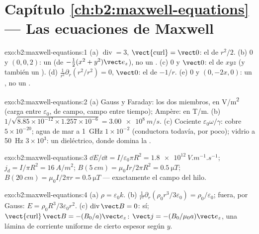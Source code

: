 \section*{Capítulo \ref{ch:b2:maxwell-equations} --- Las ecuaciones de Maxwell}

\begin{solution}{exo:b2:maxwell-equations:1}
(a) $\operatorname{div} = 3$, $\operatorname{\vect{curl}} = \vect 0$: el  de $r^2/2$.
(b) $0$ y $(0, 0, 2)$: un  (de $-\tfrac12(x^2 + y^2)\vect e_z$), no un
. (c) $0$ y $\vect 0$: el  de $xyz$ (y también un ). (d)
$\frac1{r^2}\partial_r(r^2/r^2) = 0$,  $\vect 0$: el  de $-1/r$. (e)
$0$ y $(0, -2x, 0)$: un , no un .
\end{solution}

\begin{solution}{exo:b2:maxwell-equations:2}
(a) Gauss y Faraday: los dos miembros, en \unit{V/m^2} (carga entre
$\varepsilon_0$,  de campo, campo entre tiempo); Ampère: en \unit{T/m}.
(b) $1/\sqrt{8.85 \times 10^{-12} \times 1.257 \times 10^{-6}} = \qty{3.00e8}{m/s}$. (c) Cociente
$\varepsilon_0\omega/\gamma$: cobre $5 \times 10^{-20}$; agua de mar a \qty{1}{GHz} $1 \times 10^{-2}$
(conductora todavía, por poco); vidrio a \qty{50}{Hz} $3 \times 10^3$: un dieléctrico,
donde domina la .
\end{solution}

\begin{solution}{exo:b2:maxwell-equations:3}
$\dd E/\dd t = I/\varepsilon_0\pi R^2 = \qty{1.8e12}{V.m^{-1}.s^{-1}}$; $j_d = I/\pi R^2 =
\qty{16}{A/m^2}$; $B(\qty{5}{cm}) = \mu_0Ir/2\pi R^2 = \qty{0.5}{\micro T}$; $B(\qty{20}{cm}) =
\mu_0I/2\pi r = \qty{0.5}{\micro T}$ --- exactamente el campo del hilo.
\end{solution}

\begin{solution}{exo:b2:maxwell-equations:4}
(a) $\rho = \varepsilon_0k$. (b) $\frac1{r^2}\partial_r(\rho_0r^3/3\varepsilon_0) = \rho_0/\varepsilon_0$;
fuera, por Gauss: $E = \rho_0R^3/3\varepsilon_0r^2$. (c) $\operatorname{div}\vect B = 0$: sí;
$\operatorname{\vect{curl}}\vect B = -(B_0/a)\vect e_z$: $\vect j = -(B_0/\mu_0a)\vect e_z$, una
lámina de corriente uniforme de cierto espesor según $y$.
\end{solution}

